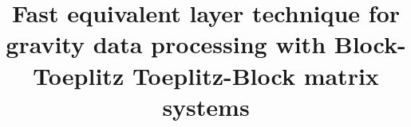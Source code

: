 \documentclass[manuscript,revised]{geophysics}
\begin{document}
\title{Fast equivalent layer technique for gravity data processing with Block-Toeplitz Toeplitz-Block matrix systems}

\renewcommand{\thefootnote}{\fnsymbol{footnote}} 




\maketitle

\begin{abstract}

\lipsum[1]


\end{abstract}
\end{document}
